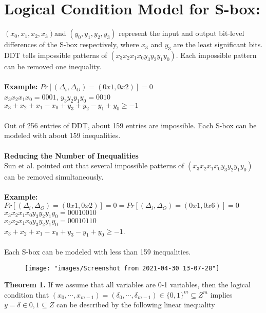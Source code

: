 \documentclass{article}
\begin{document}
\section{Logical Condition Model for S-box:}
$(x_0,x_1,x_2,x_3)$and $(y_0,y_1,y_2,y_3)$ represent the input and output bit-level differences of the S-box respectively, where $x_3$ and $y_3$ are the least significant bits.
DDT tells impossible patterns of $(x_3x_2x_1x_0y_3y_2y_1y_0)$. Each impossible pattern can be removed one inequality.\\\\
\textbf{Example:} $Pr[(\Delta_i, \Delta_O) = (0x1,0x2)] = 0$\\
$x_3x_2x_1x_0 = 0001$, $y_3y_2y_1y_0 = 0010$\\
$x_3+x_2+x_1-x_0+y_3+y_2-y_1+y_0 \ge -1$\\\\
Out of 256 entries of DDT, about 159 entries are impossible. Each S-box can be modeled with about 159 inequalities.\\\\
\textbf{Reducing the Number of Inequalities}\\
Sun et al. pointed out that several impossible patterns of $(x_3x_2x_1x_0y_3y_2y_1y_0)$ can be removed simultaneously.\\\\
\textbf{Example:}\\
$Pr[(\Delta_i, \Delta_O) = (0x1,0x2)] = 0 = Pr[(\Delta_i, \Delta_O) = (0x1,0x6)] = 0$\\
$x_3x_2x_1x_0y_3y_2y_1y_0 = 00010010$\\
$x_3x_2x_1x_0y_3y_2y_1y_0 = 00010110$\\
$x_3+x_2+x_1-x_0+y_3-y_1+y_0 \ge -1$.\\\\
Each S-box can be modeled with less than 159 inequalities.\\
\begin{figure}
	\centering
	\texttt{[image: "images/Screenshot from 2021-04-30 13-07-28"]}
	\caption{}
	\label{fig:screenshot-from-2021-04-30-13-07-28}
\end{figure}
\textbf{Theorem 1.}  If we assume that all variables are 0-1 variables, then the logical condition that $(x_0,\cdots,x_{m-1}) = (\delta_0,\cdots,\delta_{m-1}) \in \{0,1\}^m \subseteq Z^m$ implies $y = \delta \in {0,1} \subseteq Z$ can be described by the following linear inequality\\\\
\end{document}
